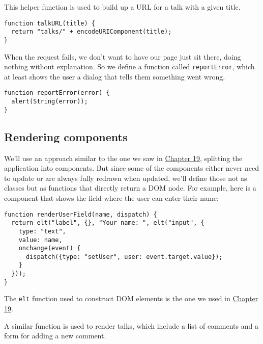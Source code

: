 This helper function is used to build up a URL for a talk with a given title.

\begin{lstlisting}
function talkURL(title) {
  return "talks/" + encodeURIComponent(title);
}
\end{lstlisting}
\noindent{}

When the request fails, we don't want to have our page just sit there, doing nothing without explanation. So we define a function called \lstinline`reportError`, which at least shows the user a dialog that tells them something went wrong.

\begin{lstlisting}
function reportError(error) {
  alert(String(error));
}
\end{lstlisting}
\noindent

\subsection{Rendering components}

We'll use an approach similar to the one we saw in \hyperref[paint]{Chapter 19}, splitting the application into components. But since some of the components either never need to update or are always fully redrawn when updated, we'll define those not as classes but as functions that directly return a DOM node. For example, here is a component that shows the field where the user can enter their name:

\begin{lstlisting}
function renderUserField(name, dispatch) {
  return elt("label", {}, "Your name: ", elt("input", {
    type: "text",
    value: name,
    onchange(event) {
      dispatch({type: "setUser", user: event.target.value});
    }
  }));
}
\end{lstlisting}
\noindent{}

The \lstinline`elt` function used to construct DOM elements is the one we used in \hyperref[paint]{Chapter 19}.

A similar function is used to render talks, which include a list of comments and a form for adding a new comment.

